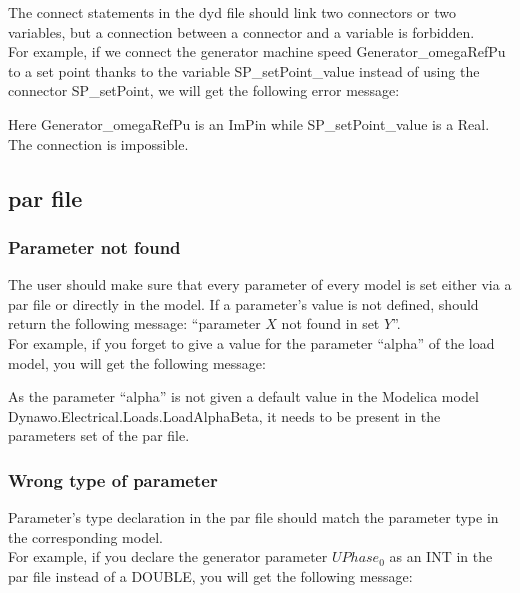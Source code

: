 \documentclass[a4paper, 12pt]{report}
\begin{document}
The connect statements in the dyd file should link two connectors or two variables, but a connection between a connector and a variable is forbidden. \\

For example, if we connect the generator machine speed Generator\_omegaRefPu to a set point thanks to the variable SP\_setPoint\_value instead of using the connector SP\_setPoint, we will get the following error message:



Here Generator\_omegaRefPu is an ImPin while SP\_setPoint\_value is a Real. The connection is impossible.

\subsection{par file}

\subsubsection{Parameter not found}

The user should make sure that every parameter of every model is set either via a par file or directly in the model. If a parameter's value is not defined, \Dynawo should return the following message: ``parameter $X$ not found in set $Y$''. \\

For example, if you forget to give a value for the parameter ``alpha'' of the load model, you will get the following message:


As the parameter ``alpha'' is not given a default value in the Modelica model Dynawo.Electrical.Loads.LoadAlphaBeta, it needs to be present in the parameters set of the par file.

\subsubsection{Wrong type of parameter}

Parameter's type declaration in the par file should match the parameter type in the corresponding model. \\

For example, if you declare the generator parameter $UPhase_0$ as an INT in the par file instead of a DOUBLE, you will get the following message:
\vspace{0.6cm} %

\end{document}
